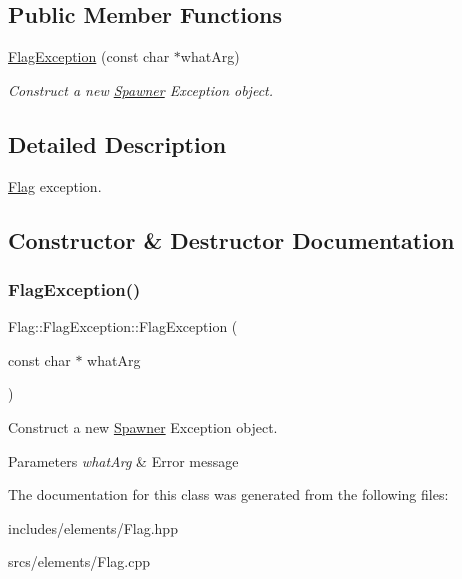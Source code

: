 \subsection*{Public Member Functions}
\begin{DoxyCompactItemize}
\item 
\hyperlink{class_flag_1_1_flag_exception_a59370a8b04e9b81bf4c80bfbdcb417f5}{Flag\+Exception} (const char $\ast$what\+Arg)
\begin{DoxyCompactList}\small\item\em Construct a new \hyperlink{class_spawner}{Spawner} Exception object. \end{DoxyCompactList}\end{DoxyCompactItemize}


\subsection{Detailed Description}
\hyperlink{class_flag}{Flag} exception. 

\subsection{Constructor \& Destructor Documentation}
\mbox{\label{class_flag_1_1_flag_exception_a59370a8b04e9b81bf4c80bfbdcb417f5}} 
\subsubsection{\texorpdfstring{Flag\+Exception()}{FlagException()}}
{\footnotesize\ttfamily Flag\+::\+Flag\+Exception\+::\+Flag\+Exception (\begin{DoxyParamCaption}\item[{const char $\ast$}]{what\+Arg }\end{DoxyParamCaption})\hspace{0.3cm}{\ttfamily [explicit]}}



Construct a new \hyperlink{class_spawner}{Spawner} Exception object. 


\begin{DoxyParams}{Parameters}
{\em what\+Arg} & Error message \\
\hline
\end{DoxyParams}


The documentation for this class was generated from the following files\+:\begin{DoxyCompactItemize}
\item 
includes/elements/Flag.\+hpp\item 
srcs/elements/Flag.\+cpp\end{DoxyCompactItemize}
